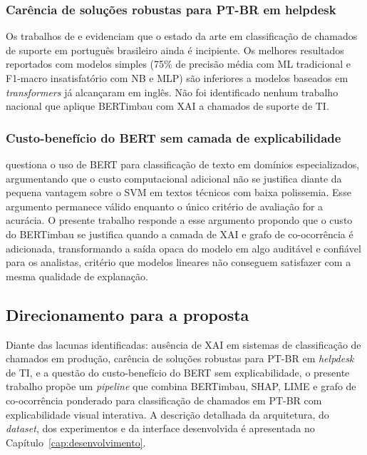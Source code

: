 \documentclass[
    12pt,                %
    openright,           %
    oneside,             %
    a4paper,             %
    english,             %
    brazil               %
]{abntex2}
\begin{document}
\subsubsection{Carência de soluções robustas para PT-BR em helpdesk}
\label{subsubsec:lacuna_ptbr}

Os trabalhos de  e  evidenciam que o estado da arte em classificação de chamados de suporte em português brasileiro ainda é incipiente. Os melhores resultados reportados com modelos simples (75\% de precisão média com ML tradicional e F1-macro insatisfatório com NB e MLP) são inferiores a modelos baseados em \textit{transformers} já alcançaram em inglês. Não foi identificado nenhum trabalho nacional que aplique BERTimbau com XAI a chamados de suporte de TI.

\subsubsection{Custo-benefício do BERT sem camada de explicabilidade}
\label{subsubsec:lacuna_wahba}

 questiona o uso de BERT para classificação de texto em domínios especializados, argumentando que o custo computacional adicional não se justifica diante da pequena vantagem sobre o SVM em textos técnicos com baixa polissemia. Esse argumento permanece válido enquanto o único critério de avaliação for a acurácia. O presente trabalho responde a esse argumento propondo que o custo do BERTimbau se justifica quando a camada de XAI e grafo de co-ocorrência é adicionada, transformando a saída opaca do modelo em algo auditável e confiável para os analistas, critério que modelos lineares não conseguem satisfazer com a mesma qualidade de explanação.

\subsection{Direcionamento para a proposta}
\label{subsec:sintese_direcao}

Diante das lacunas identificadas: ausência de XAI em sistemas de classificação de chamados em produção, carência de soluções robustas para PT-BR em \textit{helpdesk} de TI, e a questão do custo-benefício do BERT sem explicabilidade, o presente trabalho propõe um \textit{pipeline} que combina BERTimbau, SHAP, LIME e grafo de co-ocorrência ponderado para classificação de chamados em PT-BR com explicabilidade visual interativa. A descrição detalhada da arquitetura, do \textit{dataset}, dos experimentos e da interface desenvolvida é apresentada no Capítulo~\ref{cap:desenvolvimento}.
\end{document}
